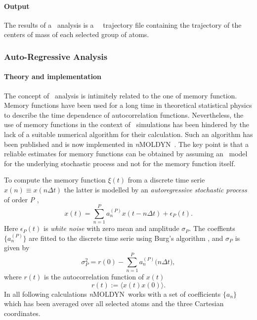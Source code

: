 \documentclass[a4paper,11pt]{report}
\newcommand{\NMOLDYN}{\textit{n}MOLDYN}
\begin{document}
\paragraph{Output\\}
The results of a \COMT\ analysis is a \MMTK\ \NetCDF\ trajectory file containing the trajectory of the centers of mass of 
each selected group of atoms.

\subsubsection{Auto-Regressive Analysis}
\label{ara}
\paragraph{Theory and implementation\\}
\label{ara_theory}
The concept of \ARA\ analysis is intimitely related to the one of memory function. Memory functions have 
been used for a long time in theoretical statistical physics to describe the time dependence of autocorrelation
functions. Nevertheless, the use of memory functions in the context of \MD\ simulations has been hindered by the lack of a 
suitable numerical algorithm for their calculation. Such an algorithm has been published and is now implemented in 
\NMOLDYN\ \cite{Hinsen:2001}. The key point is that a reliable estimates for memory functions can be obtained by assuming 
an \AR\ model for the underlying stochastic process and not for the memory function itself.

To compute the memory function $\xi(t)$ from a discrete time serie $x(n) \equiv x(n\Delta t)$ the latter is modelled by an 
{\em autoregressive stochastic process} of order \textit{P} \cite{Papoulis:1991,Makhoul:1975},
\begin{equation}
\label{eq:ar}
x(t) = \sum_{n=1}^P a^{(P)}_n x(t- n \Delta t) + \epsilon_P(t).
\end{equation}
Here $\epsilon_P(t)$ is {\em white noise} with zero mean and amplitude
$\sigma_P$. The coeffients $\{a^{(P)}_n\}$ are fitted to the discrete time serie using Burg's algorithm \cite{Burg,Makhoul:1977}, 
and $\sigma_P$ is given by
\begin{equation}
\sigma_P^2=r(0)-\sum_{n=1}^P a_n^{(P)} \mathrm(n\Delta t),
\end{equation}
where $r(t)$ is the autocorrelation function of $x(t)$
\begin{equation}
r(t) :=\langle x(t)x(0)\rangle. 
\end{equation}
In all following calculations \NMOLDYN\ works with a set of coefficients $\{a_n\}$ which has been averaged over all 
selected atoms and the three Cartesian coordinates.
\end{document}
